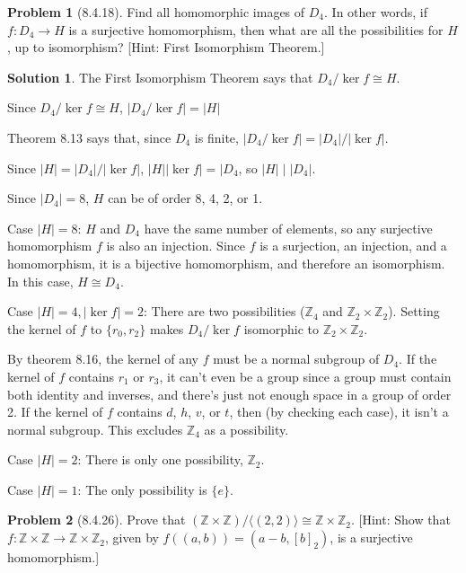 \documentclass[12pt]{article}
\theoremstyle{definition}
\newtheorem*{prob}{Problem}
\newtheorem*{soln}{Solution}
\newcommand{\ZZ}{{\mathbb{Z}}}
\renewcommand{\ker}{\operatorname{ker}}
\begin{document}
\begin{prob}[8.4.18]
Find all homomorphic images of  $D_4$.
In other words, if $f:D_4 \to H$ is a surjective homomorphism,
then what are all the possibilities for $H$, up to isomorphism? [Hint: 
First Isomorphism Theorem.]
\end{prob}

\begin{soln}

The First Isomorphism Theorem says that $D_4/\ker f\cong H$.

Since $D_4/\ker f\cong H$, $|D_4/\ker f| = |H|$

Theorem 8.13 says that, since $D_4$ is finite, $|D_4/\ker f|=|D_4|/|\ker f|$.

Since $|H|=|D_4|/|\ker f|$, $|H||\ker f|=|D_4$, so $|H|\mid |D_4|$.

Since $|D_4|=8$, $H$ can be of order 8, 4, 2, or 1.

Case $|H|=8$: $H$ and $D_4$ have the same number of elements,
so any surjective homomorphism $f$ is also an injection.
Since $f$ is a surjection, an injection, and a homomorphism,
it is a bijective homomorphism, and therefore an isomorphism.
In this case, $H\cong D_4$.

Case $|H|=4,|\ker f|=2$: There are two possibilities ($\ZZ_4$ and $\ZZ_2\times\ZZ_2$).
Setting the kernel of $f$ to $\{r_0,r_2\}$ makes $D_4/\ker f$
isomorphic to $\ZZ_2\times\ZZ_2$.

By theorem 8.16, the kernel of any $f$ must be a normal subgroup of $D_4$.
If the kernel of $f$ contains $r_1$ or $r_3$, it can't even be a group
since a group must contain both identity and inverses,
and there's just not enough space in a group of order 2.
If the kernel of $f$ contains $d$, $h$, $v$, or $t$,
then (by checking each case), it isn't a normal subgroup.
This excludes $\ZZ_4$ as a possibility.

Case $|H|=2$: There is only one possibility, $\ZZ_2$.

Case $|H|=1$: The only possibility is $\{e\}$.

\end{soln}

\begin{prob}[8.4.26]
Prove that $(\ZZ \times \ZZ)/\langle (2, 2) \rangle \cong \ZZ \times \ZZ_2$. 
[Hint: Show that $f:\ZZ \times \ZZ \to \ZZ \times \ZZ_2$, given by 
$f ((a, b)) = (a - b, [b]_2)$, 
is a surjective homomorphism.]
\end{prob}
\end{document}
